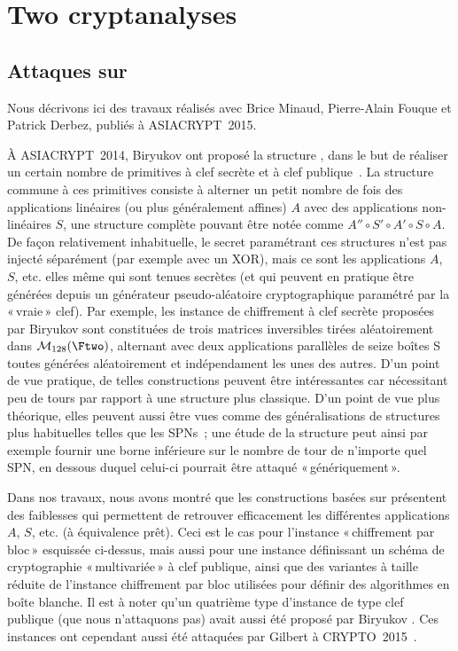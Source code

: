 \section[Deux cryptanalyses]{Two cryptanalyses}

\subsection{Attaques sur \asasa \cite{DBLP:conf/asiacrypt/MinaudDFK15}}
Nous décrivons ici des travaux réalisés avec Brice Minaud, Pierre-Alain Fouque et Patrick Derbez, publiés à ASIACRYPT~2015.

\medskip

À ASIACRYPT~2014, Biryukov \etal ont proposé la structure \asasa, dans le but de réaliser un certain nombre de primitives à clef secrète et à clef publique~\cite{DBLP:conf/asiacrypt/BiryukovBK14}.
La structure commune à ces primitives consiste à alterner un petit nombre de fois des applications linéaires (ou plus généralement affines) $A$ avec des applications non-linéaires $S$, une structure
complète pouvant être notée
comme $A'' \circ S' \circ A' \circ S \circ A$. De façon relativement inhabituelle, le secret paramétrant ces structures n'est pas injecté séparément (par exemple avec un XOR), mais ce sont
les applications $A$, $S$, etc. elles même qui sont tenues secrètes (et qui peuvent en pratique être générées depuis un générateur pseudo-aléatoire cryptographique paramétré par la «\,vraie\,»
clef). Par exemple, les instance \asasa de chiffrement à clef secrète proposées par Biryukov \etal sont constituées de
trois matrices inversibles tirées aléatoirement dans $\mathcal{M}_{128}(\Ftwo)$,
alternant avec deux applications parallèles de seize boîtes S toutes générées aléatoirement et indépendament les unes des autres.
D'un point de vue pratique, de telles constructions peuvent être intéressantes car nécessitant peu de tours par rapport à une structure plus classique. D'un point de vue plus théorique, elles peuvent
aussi être vues comme des généralisations de structures plus habituelles telles que les SPNs~; une étude de la structure \asasa peut ainsi par exemple fournir une borne inférieure sur le nombre de tour
de n'importe quel SPN, en dessous duquel celui-ci pourrait être attaqué «\,génériquement\,».

Dans nos travaux, nous avons montré que les constructions basées sur \asasa présentent des faiblesses qui permettent de retrouver efficacement les différentes applications $A$, $S$, etc.
(à équivalence prêt). Ceci est le cas pour l'instance «\,chiffrement par bloc\,» esquissée ci-dessus, mais aussi pour une instance définissant un schéma de cryptographie «\,multivariée\,»
à clef publique, ainsi que des variantes à taille réduite de l'instance chiffrement par bloc utilisées pour définir des algorithmes en boîte blanche.
Il est à noter qu'un quatrième type d'instance de type clef publique (que nous n'attaquons pas) avait aussi été proposé par Biryukov \etal. Ces instances ont cependant aussi été attaquées par
Gilbert \etal à CRYPTO~2015~\cite{DBLP:conf/crypto/GilbertPT15}.
 
